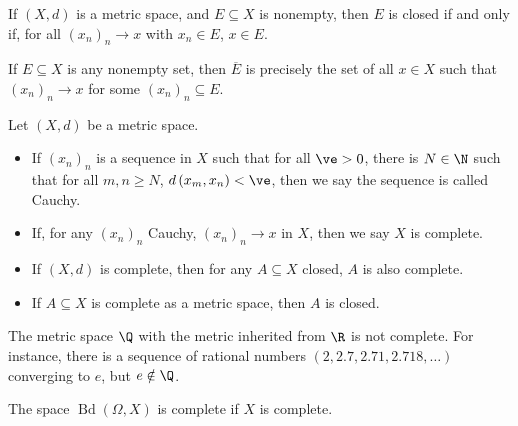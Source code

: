 \begin{definition}
  If $\left(X,d\right)$ is a metric space, and $E\subseteq X$ is nonempty, then $E$ is closed if and only if, for all $\left(x_n\right)_n\rightarrow x$ with $x_n\in E$, $x\in E$.\newline

  If $E\subseteq X$ is any nonempty set, then $\overline{E}$ is precisely the set of all $x\in X$ such that $\left(x_n\right)_n\rightarrow x$ for some $\left(x_n\right)_n\subseteq E$.
\end{definition}
\begin{definition}[Completeness]
  Let $\left(X,d\right)$ be a metric space.
  \begin{itemize}
    \item If $\left(x_n\right)_n$ is a sequence in $X$ such that for all $\ve > 0$, there is $N\in \N$ such that for all $m,n\geq N$, $d\left(x_m,x_n\right) < \ve$, then we say the sequence is called Cauchy.
    \item If, for any $\left(x_n\right)_n$ Cauchy, $\left(x_n\right)_n\rightarrow x$ in $X$, then we say $X$ is complete.
    \item If $\left(X,d\right)$ is complete, then for any $A\subseteq X$ closed, $A$ is also complete.
    \item If $A\subseteq X$ is complete as a metric space, then $A$ is closed.
  \end{itemize}
\end{definition}
\begin{example}
  The metric space $\Q$ with the metric inherited from $\R$ is not complete. For instance, there is a sequence of rational numbers $\left(2,2.7,2.71,2.718,\dots\right)$ converging to $e$, but $e\notin \Q$.\newline

  The space $\operatorname{Bd}\left(\Omega,X\right)$ is complete if $X$ is complete.
\end{example}
